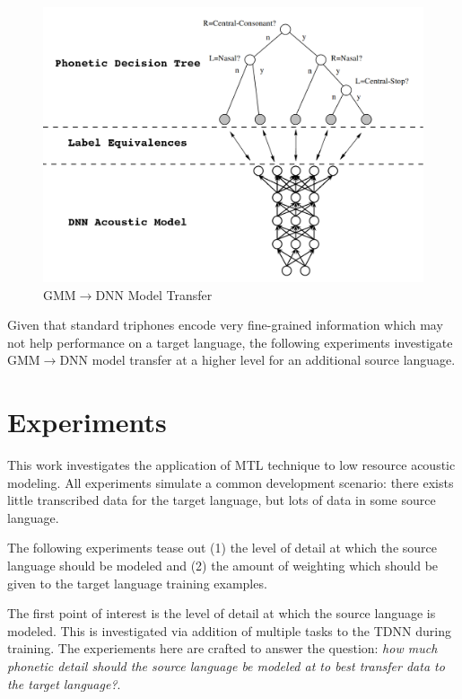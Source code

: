 \documentclass[a4paper]{article}
\begin{document}
\begin{figure}[!htbp]
  \centering
{}
  \includegraphics[width=\linewidth]{figs/tree-net.png}
  \caption{GMM$\rightarrow$DNN Model Transfer}
    \label{fig:tree-net}
  \endminipage\hfill
\end{figure}


Given that standard triphones encode very fine-grained information which may not help performance on a target language, the following experiments investigate GMM$\rightarrow$DNN model transfer at a higher level for an additional source language. 


\section{Experiments}

This work investigates the application of MTL technique to low resource acoustic modeling. All experiments simulate a common development scenario: there exists little transcribed data for the target language, but lots of data in some source language.

The following experiments tease out (1) the level of detail at which the source language should be modeled and (2) the amount of weighting which should be given to the target language training examples.

The first point of interest is the level of detail at which the source language is modeled. This is investigated via addition of multiple tasks to the TDNN during training. The experiements here are crafted to answer the question: \textit{how much phonetic detail should the source language be modeled at to best transfer data to the target language?}.
\end{document}
